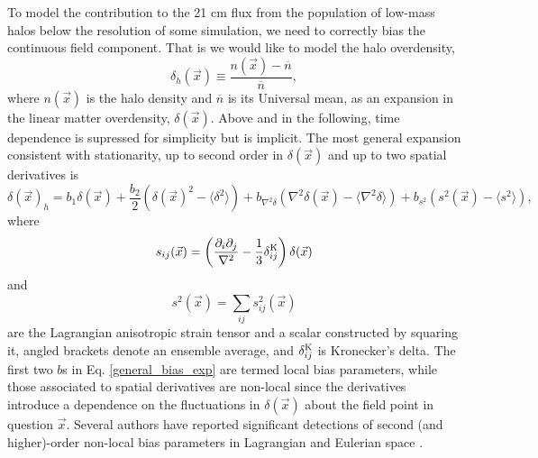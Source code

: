 To model the contribution to the 21 cm flux from the population of low-mass halos below the resolution of some simulation, we need to correctly bias the continuous field component. That is we would like to model the halo overdensity,
\begin{equation}
\delta_h(\vec{x}) \equiv \frac{n(\vec{x}) - \overline{n}}{\overline{n}},
\end{equation}
where $n(\vec{x})$ is the halo density and $\overline{n}$ is its Universal mean, as an expansion in the linear matter overdensity, $\delta(\vec{x})$. Above and in the following, time dependence is supressed for simplicity but is implicit. The most general expansion consistent with stationarity, up to second order in $\delta(\vec{x})$ and up to two spatial derivatives is
\begin{equation}
\delta(\vec{x})_h = b_1 \delta(\vec{x}) + \frac{b_2}{2} \left( \delta(\vec{x})^2 - \langle \delta^2 \rangle \right)+ b_{\nabla^2\delta} \left( \nabla^2\delta(\vec{x}) - \langle \nabla^2\delta \rangle \right) + b_{s^2} \left( s^2(\vec{x}) - \langle s^2 \rangle \right), \label{general_bias_exp}
\end{equation}
where
\begin{equation}
s_{ij}(\vec{x}) = \left( \frac{\partial_i \partial_j}{\nabla^2} - \frac{1}{3}\delta^{\rm K}_{ij}\right) \delta(\vec{x})
\end{equation}
and
\begin{equation}
s^2(\vec{x}) = \sum_{ij} s^2_{ij}(\vec{x})
\end{equation}
are the Lagrangian anisotropic strain tensor and a scalar constructed by squaring it, angled brackets denote an ensemble average, and $\delta_{ij}^{\rm K}$ is Kronecker's delta. The first two $b$s in Eq. \ref{general_bias_exp} are termed local bias parameters, while those associated to spatial derivatives are non-local since the derivatives introduce a dependence on the fluctuations in $\delta(\vec{x})$ about the field point in question $\vec{x}$. Several authors have reported significant detections of second (and higher)-order non-local bias parameters in Lagrangian \citep{shethetal2013, biagettietal2014, modietal2017, abidi+baldauf2018} and Eulerian space \cite{lazeyrasetal2017}.

